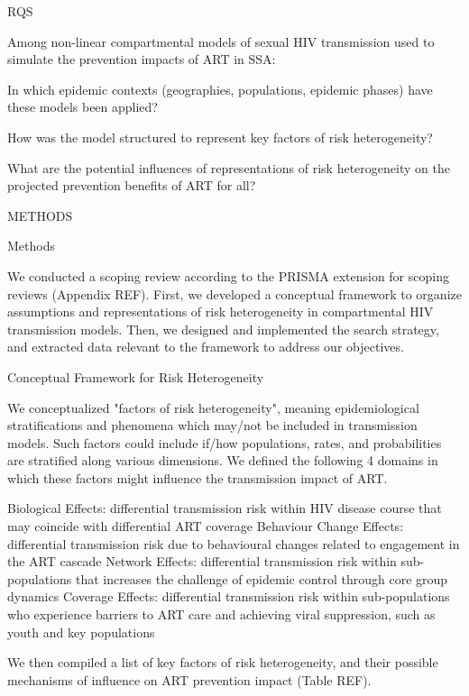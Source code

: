 RQS

Among non-linear compartmental models of sexual HIV transmission
used to simulate the prevention impacts of ART in SSA:

      In which epidemic contexts (geographies, populations, epidemic phases)
      have these models been applied?

      How was the model structured to represent key factors of risk heterogeneity?

      What are the potential influences of representations of risk heterogeneity
      on the projected prevention benefits of ART for all?

METHODS

Methods

We conducted a scoping review according to the PRISMA extension for scoping reviews
(Appendix REF).
First, we developed a conceptual framework to organize
assumptions and representations of risk heterogeneity
in compartmental HIV transmission models.
Then, we designed and implemented the search strategy,
and extracted data relevant to the framework to address our objectives.

Conceptual Framework for Risk Heterogeneity

We conceptualized "factors of risk heterogeneity", meaning
epidemiological stratifications and phenomena which may/not be included in transmission models.
Such factors could include if/how populations, rates, and probabilities
are stratified along various dimensions.
We defined the following 4 domains in which
these factors might influence the transmission impact of ART.

   Biological Effects:
  differential transmission risk within HIV disease course
  that may coincide with differential ART coverage
  \cite{Pilcher2004}
   Behaviour Change Effects:
  differential transmission risk due to
  behavioural changes related to engagement in the ART cascade
  \cite{Ramachandran2016,Tiwari2020}
   Network Effects:
  differential transmission risk within sub-populations
  that increases the challenge of epidemic control through core group dynamics
  \cite{Boily1997,Watts2010,Dodd2010}
   Coverage Effects:
  differential transmission risk within sub-populations
  who experience barriers to ART care and achieving viral suppression,
  such as youth and key populations
  \cite{Mountain2014,Lancaster2016,Hakim2018,Green2020}

We then compiled a list of key factors of risk heterogeneity,
and their possible mechanisms of influence on ART prevention impact (Table REF).

